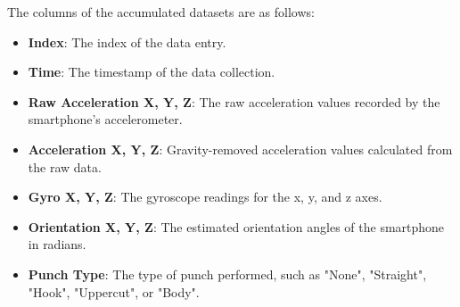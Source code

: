 \documentclass{article}
\begin{document}
    The columns of the accumulated datasets are as follows:
    \begin{itemize}
        \item \textbf{Index}: The index of the data entry.

        \item \textbf{Time}: The timestamp of the data collection.

        \item \textbf{Raw Acceleration X, Y, Z}: The raw acceleration values recorded
            by the smartphone's accelerometer.

        \item \textbf{Acceleration X, Y, Z}: Gravity-removed acceleration values
            calculated from the raw data.

        \item \textbf{Gyro X, Y, Z}: The gyroscope readings for the x, y, and z axes.

        \item \textbf{Orientation X, Y, Z}: The estimated orientation angles of the
            smartphone in radians.

        \item \textbf{Punch Type}: The type of punch performed, such as "None", "Straight",
            "Hook", "Uppercut", or "Body".
    \end{itemize}
\end{document}
